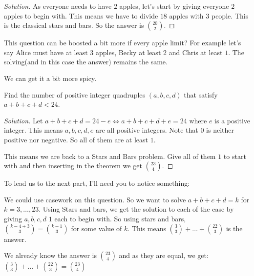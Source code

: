 \begin{proof}
    [Solution]
    As everyone needs to have $2$ apples, let's start by giving everyone $2$ apples 
    to begin with. This means we have to divide $18$ apples with $3$ people. This is 
    the classical stars and bars. So the answer is $\binom{20}{2}$.
\end{proof}
This question can be boosted a bit more if every apple limit? For 
example let's say Alice must have at least $3$ apples, Becky at least $2$ and Chris 
at least $1$. The solving(and in this case the answer) remains the same.\par
We can get it a bit more spicy.
\begin{example}
    Find the number of positive integer quadruples $(a, b, c, d)$ that satisfy $a+b+c+d<24$.
\end{example}
\begin{proof}
    [Solution]
    Let $a+b+c+d=24-e \iff a+b+c+d+e=24$ where $e$ is a positive integer. 
    This means $a,b,c,d,e$ are all positive integers. Note that $0$ is neither 
    positive nor negative. So all of them are at least $1$.\par
    This means we are back to a Stars and Bars problem. Give all of them $1$ to start with 
    and then inserting in the theorem we get $\binom{23}{4}$.
\end{proof}
To lead us to the next part, I'll need you to notice something:\par
We could use casework on this question. So we want to solve $a+b+c+d=k$ for $k=3,\dots,23$. Using 
Stars and bars, we get the solution to each of the case by giving $a,b,c,d$ $1$ each to begin 
with. So using stars and bars, $\binom{k-4+3}{3}=\binom{k-1}{3}$ for some value of $k$. 
This means $\binom{3}{3}+\dots+\binom{22}{3}$ is the answer.\par
We already know the answer is $\binom{23}{4}$ and as they are equal, 
we get: $\binom{3}{3}+\dots+\binom{22}{3} = \binom{23}{4}$\par
